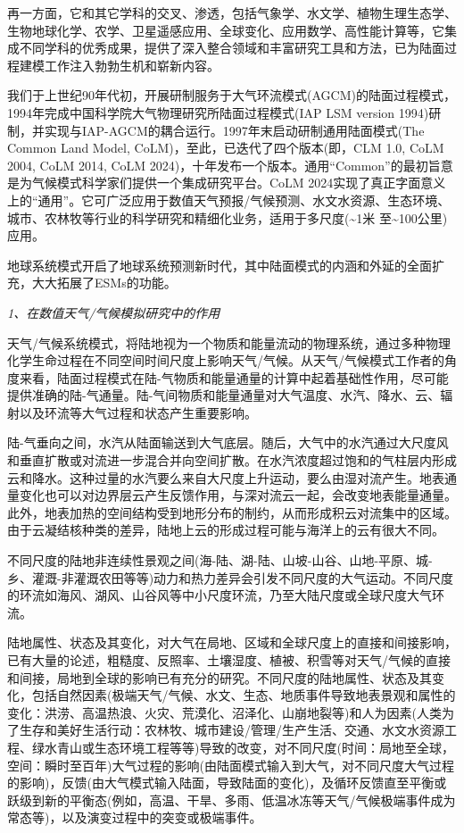 再一方面，它和其它学科的交叉、渗透，包括气象学、水文学、植物生理生态学、生物地球化学、农学、卫星遥感应用、全球变化、应用数学、高性能计算等，它集成不同学科的优秀成果，提供了深入整合领域和丰富研究工具和方法，已为陆面过程建模工作注入勃勃生机和崭新内容。

我们于上世纪90年代初，开展研制服务于大气环流模式(AGCM)的陆面过程模式，1994年完成中国科学院大气物理研究所陆面过程模式(IAP LSM version 1994)研制，并实现与IAP-AGCM的耦合运行。1997年末启动研制通用陆面模式(The Common Land Model, CoLM)，至此，已迭代了四个版本(即，CLM 1.0, CoLM 2004, CoLM 2014, CoLM 2024)，十年发布一个版本。通用“Common”的最初旨意是为气候模式科学家们提供一个集成研究平台。CoLM 2024实现了真正字面意义上的“通用”。它可广泛应用于数值天气预报/气候预测、水文水资源、生态环境、城市、农林牧等行业的科学研究和精细化业务，适用于多尺度(\textasciitilde1米 至\textasciitilde100公里)应用。

地球系统模式开启了地球系统预测新时代，其中陆面模式的内涵和外延的全面扩充，大大拓展了ESMs的功能。

\textit{1、在数值天气/气候模拟研究中的作用}

天气/气候系统模式，将陆地视为一个物质和能量流动的物理系统，通过多种物理化学生命过程在不同空间时间尺度上影响天气/气候。从天气/气候模式工作者的角度来看，陆面过程模式在陆-气物质和能量通量的计算中起着基础性作用，尽可能提供准确的陆-气通量。陆-气间物质和能量通量对大气温度、水汽、降水、云、辐射以及环流等大气过程和状态产生重要影响。

陆-气垂向之间，水汽从陆面输送到大气底层。随后，大气中的水汽通过大尺度风和垂直扩散或对流进一步混合并向空间扩散。在水汽浓度超过饱和的气柱层内形成云和降水。这种过量的水汽要么来自大尺度上升运动，要么由湿对流产生。地表通量变化也可以对边界层云产生反馈作用，与深对流云一起，会改变地表能量通量。此外，地表加热的空间结构受到地形分布的制约，从而形成积云对流集中的区域。由于云凝结核种类的差异，陆地上云的形成过程可能与海洋上的云有很大不同。

不同尺度的陆地非连续性景观之间(海-陆、湖-陆、山坡-山谷、山地-平原、城-乡、灌溉-非灌溉农田等等)动力和热力差异会引发不同尺度的大气运动。不同尺度的环流如海风、湖风、山谷风等中小尺度环流，乃至大陆尺度或全球尺度大气环流。

陆地属性、状态及其变化，对大气在局地、区域和全球尺度上的直接和间接影响，已有大量的论述，粗糙度、反照率、土壤湿度、植被、积雪等对天气/气候的直接和间接，局地到全球的影响已有充分的研究。不同尺度的陆地属性、状态及其变化，包括自然因素(极端天气/气候、水文、生态、地质事件导致地表景观和属性的变化：洪涝、高温热浪、火灾、荒漠化、沼泽化、山崩地裂等)和人为因素(人类为了生存和美好生活行动：农林牧、城市建设/管理/生产生活、交通、水文水资源工程、绿水青山或生态环境工程等等)导致的改变，对不同尺度(时间：局地至全球，空间：瞬时至百年)大气过程的影响(由陆面模式输入到大气，对不同尺度大气过程的影响)，反馈(由大气模式输入陆面，导致陆面的变化)，及循环反馈直至平衡或跃级到新的平衡态(例如，高温、干旱、多雨、低温冰冻等天气/气候极端事件成为常态等)，以及演变过程中的突变或极端事件。

